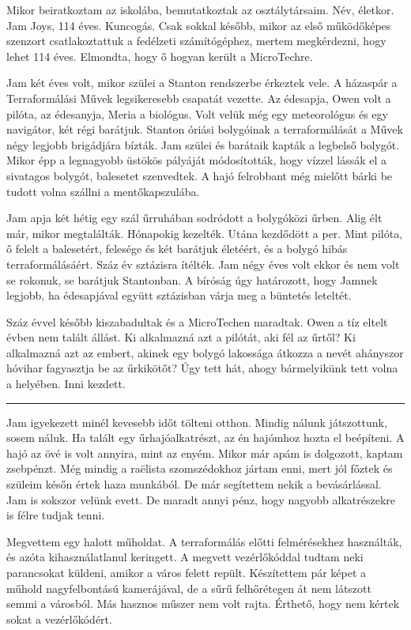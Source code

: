 \documentclass[10pt]{memoir}
\renewcommand{\pfbreakdisplay}{\bigskip \ding{70} \bigskip}
\newcommand{\secbreak}{\fancybreak{\pfbreakdisplay}}
\begin{document}
Mikor beiratkoztam az iskolába, bemutatkoztak az osztálytársaim. Név, életkor.
Jam Joys, 114 éves. Kuncogás. Csak sokkal később, mikor az első működőképes
szenzort csatlakoztattuk a fedélzeti számítógéphez, mertem megkérdezni, hogy
lehet 114 éves. Elmondta, hogy ő hogyan került a MicroTechre.

Jam két éves volt, mikor szülei a Stanton rendszerbe érkeztek vele. A házaspár
a Terraformálási Művek legsikeresebb csapatát vezette. Az édesapja, Owen volt a
pilóta, az édesanyja, Meria a biológus. Volt velük még egy meteorológus és egy
navigátor, két régi barátjuk. Stanton óriási bolygóinak a terraformálását a
Művek négy legjobb brigádjára bízták. Jam szülei és barátaik kapták a legbelső
bolygót. Mikor épp a legnagyobb üstökös pályáját módosították, hogy vízzel
lássák el a sivatagos bolygót, balesetet szenvedtek. A hajó felrobbant még
mielőtt bárki be tudott volna szállni a mentőkapszulába.

Jam apja két hétig egy szál űrruhában sodródott a bolygóközi űrben. Alig élt
már, mikor megtalálták. Hónapokig kezelték. Utána kezdődött a per. Mint pilóta,
ő felelt a balesetért, felesége és két barátjuk életéért, és a bolygó hibás
terraformálásáért. Száz év sztázisra ítélték. Jam négy éves volt ekkor és nem
volt se rokonuk, se barátjuk Stantonban. A bíróság úgy határozott, hogy Jamnek
legjobb, ha édesapjával együtt sztázisban várja meg a büntetés leteltét.

Száz évvel később kiszabadultak és a MicroTechen maradtak. Owen a tíz eltelt
évben nem talált állást. Ki alkalmazná azt a pilótát, aki fél az űrtől? Ki
alkalmazná azt az embert, akinek egy bolygó lakossága átkozza a nevét ahányszor
hóvihar fagyasztja be az űrkikötőt? Úgy tett hát, ahogy bármelyikünk tett volna
a helyében. Inni kezdett.

\secbreak

Jam igyekezett minél kevesebb időt tölteni otthon. Mindig nálunk játszottunk,
sosem náluk. Ha talált egy űrhajóalkatrészt, az én hajómhoz hozta el beépíteni.
A hajó az övé is volt annyira, mint az enyém. Mikor már apám is dolgozott,
kaptam zsebpénzt. Még mindig a raëlista szomszédokhoz jártam enni, mert jól
főztek és szüleim későn értek haza munkából. De már segítettem nekik a
bevásárlással. Jam is sokszor velünk evett. De maradt annyi pénz, hogy nagyobb
alkatrészekre is félre tudjak tenni.

Megvettem egy halott műholdat. A terraformálás előtti felmérésekhez használták,
és azóta kihasználatlanul keringett. A megvett vezérlőkóddal tudtam neki
parancsokat küldeni, amikor a város felett repült. Készítettem pár képet a
műhold nagyfelbontású kamerájával, de a sűrű felhőrétegen át nem látszott semmi
a városból. Más hasznos műszer nem volt rajta. Érthető, hogy nem kértek sokat a
vezérlőkódért.
\end{document}
